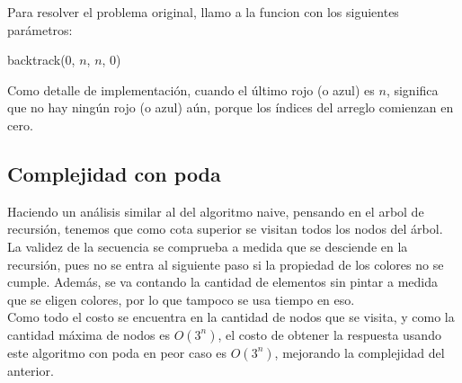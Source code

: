 Para resolver el problema original, llamo a la funcion con los siguientes parámetros:

\begin{algorithm}[H]
\begin{algorithmic}
  \State backtrack($0$, $n$, $n$, $0$)
\EndProcedure
\end{algorithmic}
\end{algorithm}

Como detalle de implementación, cuando el último rojo (o azul) es $n$, significa que no hay ningún rojo (o azul) aún, porque los índices del arreglo comienzan en cero.

\subsection{Complejidad con poda}

Haciendo un análisis similar al del algoritmo naive, pensando en el arbol de recursión, tenemos que como cota superior se visitan todos los nodos del árbol. La validez de la secuencia se comprueba a medida que se desciende en la recursión, pues no se entra al siguiente paso si la propiedad de los colores no se cumple. Además, se va contando la cantidad de elementos sin pintar a medida que se eligen colores, por lo que tampoco se usa tiempo en eso. \\

Como todo el costo se encuentra en la cantidad de nodos que se visita, y como la cantidad máxima de nodos es $O(3^{n})$, el costo de obtener la respuesta usando este algoritmo con poda en peor caso es $O(3^n)$, mejorando la complejidad del anterior.
